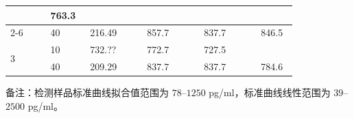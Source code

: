 \documentclass[UTF8,10pt,a4paper,fontset=fandol]{ctexart}
\newcommand{\fieldvalue}[1]{#1}
\newcommand{\handwritten}[1]{#1}
\begin{document}
\begin{tabular}{|p{0.12\linewidth}|p{0.10\linewidth}|p{0.17\linewidth}|p{0.17\linewidth}|p{0.17\linewidth}|p{0.10\linewidth}|}
&
\fieldvalue{\handwritten{763.3}}
&
\\
\cline{2-6}
&
\fieldvalue{\handwritten{40}}
&
\fieldvalue{\handwritten{216.49}}
&
\fieldvalue{\handwritten{857.7}}
&
\fieldvalue{\handwritten{837.7}}
&
\fieldvalue{\handwritten{846.5}}
\\
\hline
\multirow{2}{*}{3}
&
\fieldvalue{\handwritten{10}}
&
\fieldvalue{\handwritten{732.??}}
&
\fieldvalue{\handwritten{772.7}}
&
\fieldvalue{\handwritten{727.5}}
&
\\
\cline{2-6}
&
\fieldvalue{\handwritten{40}}
&
\fieldvalue{\handwritten{209.29}}
&
\fieldvalue{\handwritten{837.7}}
&
\fieldvalue{\handwritten{837.7}}
&
\fieldvalue{\handwritten{784.6}}
\\
\hline
\end{tabular}

\noindent
备注：检测样品标准曲线拟合值范围为 $78$--$1250$ pg/ml，标准曲线线性范围为 $39$--$2500$ pg/ml。


\newpage
\end{document}
